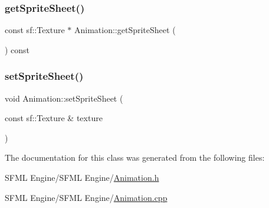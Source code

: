 \subsubsection{\texorpdfstring{get\+Sprite\+Sheet()}{getSpriteSheet()}}
{\footnotesize\ttfamily const sf\+::\+Texture $\ast$ Animation\+::get\+Sprite\+Sheet (\begin{DoxyParamCaption}{ }\end{DoxyParamCaption}) const}

\hypertarget{class_animation_a2fb16f452a323d51a0104c0aa454cab3}{}\label{class_animation_a2fb16f452a323d51a0104c0aa454cab3} 
\subsubsection{\texorpdfstring{set\+Sprite\+Sheet()}{setSpriteSheet()}}
{\footnotesize\ttfamily void Animation\+::set\+Sprite\+Sheet (\begin{DoxyParamCaption}\item[{const sf\+::\+Texture \&}]{texture }\end{DoxyParamCaption})}



The documentation for this class was generated from the following files\+:\begin{DoxyCompactItemize}
\item 
S\+F\+M\+L Engine/\+S\+F\+M\+L Engine/\hyperlink{_animation_8h}{Animation.\+h}\item 
S\+F\+M\+L Engine/\+S\+F\+M\+L Engine/\hyperlink{_animation_8cpp}{Animation.\+cpp}\end{DoxyCompactItemize}
